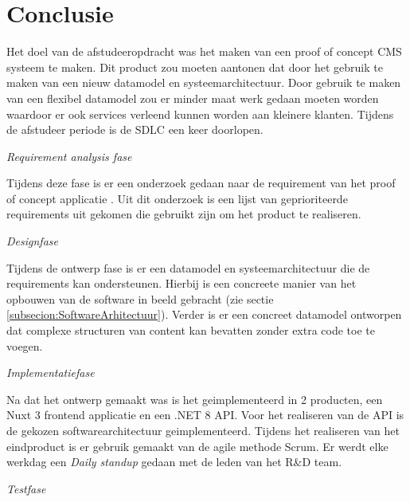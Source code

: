 \chapter{Conclusie}
Het doel van de afstudeeropdracht was het maken van een proof of concept \gls{CMS} systeem te maken.
Dit product zou moeten aantonen dat door het gebruik te maken van een nieuw datamodel en systeemarchitectuur.
Door gebruik te maken van een flexibel datamodel zou er minder maat werk gedaan  moeten worden waardoor er ook services verleend kunnen worden aan kleinere klanten.
Tijdens de afstudeer periode is de \gls{SDLC} een keer doorlopen.

\whitespace
\begin{center}
\textit{Requirement analysis fase}
\end{center}

\whitespace
Tijdens deze fase is er een onderzoek gedaan naar de requirement van het proof of concept applicatie \Parencite{DanteOnderzoek}.
Uit dit onderzoek is een lijst van geprioriteerde requirements uit gekomen die gebruikt zijn om het product te realiseren.

\whitespace
\begin{center}
\textit{Designfase}
\end{center}

\whitespace
Tijdens de ontwerp fase is er een datamodel en systeemarchitectuur die de requirements kan ondersteunen.
Hierbij is een concreete manier van het opbouwen van de software in beeld gebracht (zie sectie \ref{subsecion:SoftwareArhitectuur}).
Verder is er een concreet datamodel ontworpen dat complexe structuren van content kan bevatten zonder extra code toe te voegen.


\whitespace
\begin{center}
\textit{Implementatiefase}
\end{center}

\whitespace
Na dat het ontwerp gemaakt was is het geimplementeerd in 2 producten, een Nuxt 3 frontend applicatie en een .NET 8 API.
Voor het realiseren van de API is de gekozen softwarearchitectuur geimplementeerd.
Tijdens het realiseren van het eindproduct is er gebruik gemaakt van de agile methode Scrum.
Er werdt elke werkdag een  \textit{Daily standup} gedaan met de leden van het R\&D team. 

\whitespace
\begin{center}
\textit{Testfase}
\end{center}

